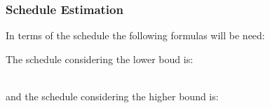 \documentclass[a4paper]{article}
\begin{document}
\subsubsection{Schedule Estimation}
In terms of the schedule the following formulas will be need:
\begin{figure}[!h]
\noindent{}%
\end{figure}

\begin{figure}[!h]
\noindent{}%
\end{figure}
The schedule considering the lower boud is:\\
\begin{figure}[!h]
\noindent{}%
\end{figure}\\
and the schedule considering the higher bound is:
\begin{figure}[!h]
\noindent{}%
\end{figure}

\newpage
\end{document}
